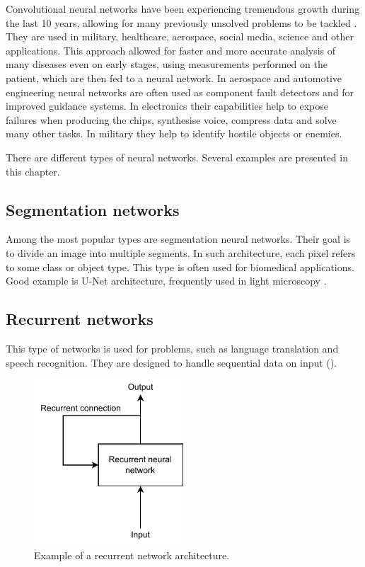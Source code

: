 Convolutional neural networks have been experiencing tremendous growth during the last 10 years, allowing for many previously unsolved problems to be tackled \cite{li2021survey}. They are used in military, healthcare, aerospace, social media, science and other applications. This approach allowed for faster and more accurate analysis of many diseases even on early stages, using measurements performed on the patient, which are then fed to a neural network. In aerospace and automotive engineering neural networks are often used as component fault detectors and for improved guidance systems. In electronics their capabilities help to expose failures when producing the chips, synthesise voice, compress data and solve many other tasks. In military they help to identify hostile objects or enemies. 


There are different types of neural networks. Several examples are presented in this chapter.

\subsection{Segmentation networks}
Among the most popular types are segmentation neural networks. Their goal is to divide an image into multiple segments. In such architecture, each pixel refers to some class or object type. This type is often used for biomedical applications. Good example is U-Net architecture, frequently used in light microscopy \cite{ronneberger2015u}.

\subsection{Recurrent networks}

This type of networks is used for problems, such as language translation and speech recognition. They are designed to handle sequential data on input ().

\begin{figure}[!h]
  \centering
  \includegraphics[width=0.5\textwidth]{./fig/photos/recurrent.pdf}

  \caption{Example of a recurrent network architecture.}
  \label{fig:recurrent}
\end{figure}

